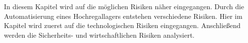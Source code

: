 %
%
%
%
In diesem Kapitel wird auf die möglichen Risiken näher eingegangen. Durch die Automatisierung eines Hochregallagers entstehen verschiedene Risiken.
Hier im Kapitel wird zuerst auf die technologischen Risiken eingegangen. Anschließend werden die Sicherheits- und wirtschaftlichen Risiken analysiert.
%
